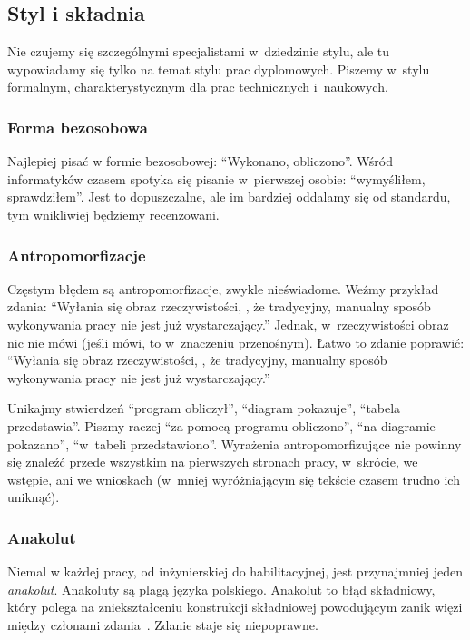 \subsection{Styl i składnia}
\label{sec:dod:styl}

Nie czujemy się szczególnymi specjalistami w~dziedzinie stylu, ale tu wypowiadamy się tylko na temat stylu prac dyplomowych. Piszemy w~stylu formalnym, charakterystycznym dla prac technicznych i~naukowych. 

\subsubsection{Forma bezosobowa}
\label{sec:dod:bezosobowo}

Najlepiej pisać w formie bezosobowej: ``Wykonano, obliczono''. Wśród informatyków czasem spotyka się pisanie w~pierwszej osobie: ``wymyśliłem, sprawdziłem''. Jest to dopuszczalne, ale im bardziej oddalamy się od standardu, tym wnikliwiej będziemy recenzowani.


\subsubsection{Antropomorfizacje}
\label{sec:dod:antropomirfizacje}

Częstym błędem są antropomorfizacje, zwykle nieświadome. Weźmy przykład zdania: ``Wyłania się obraz rzeczywistości, , że tradycyjny, manualny sposób wykonywania pracy nie jest już wystarczający.'' Jednak, w~rzeczywistości obraz nic nie mówi (jeśli mówi, to w~znaczeniu przenośnym). Łatwo to zdanie poprawić: ``Wyłania się obraz rzeczywistości, , że tradycyjny, manualny sposób wykonywania pracy nie jest już wystarczający.''

Unikajmy stwierdzeń ``program obliczył'', ``diagram pokazuje'', ``tabela przedstawia''. Piszmy raczej ``za pomocą programu obliczono'', ``na diagramie pokazano'', ``w~tabeli przedstawiono''. Wyrażenia antropomorfizujące nie powinny się znaleźć przede wszystkim na pierwszych stronach pracy, w~skrócie, we wstępie, ani we wnioskach (w~mniej wyróżniającym się tekście czasem trudno ich uniknąć).


\subsubsection{Anakolut}
\label{sec:dod:anakolut}

Niemal w każdej pracy, od inżynierskiej do habilitacyjnej, jest przynajmniej jeden {\em anakolut}. Anakoluty są plagą języka polskiego. Anakolut to błąd składniowy, który polega na zniekształceniu konstrukcji składniowej powodującym zanik więzi między członami zdania~. Zdanie staje się niepoprawne.

